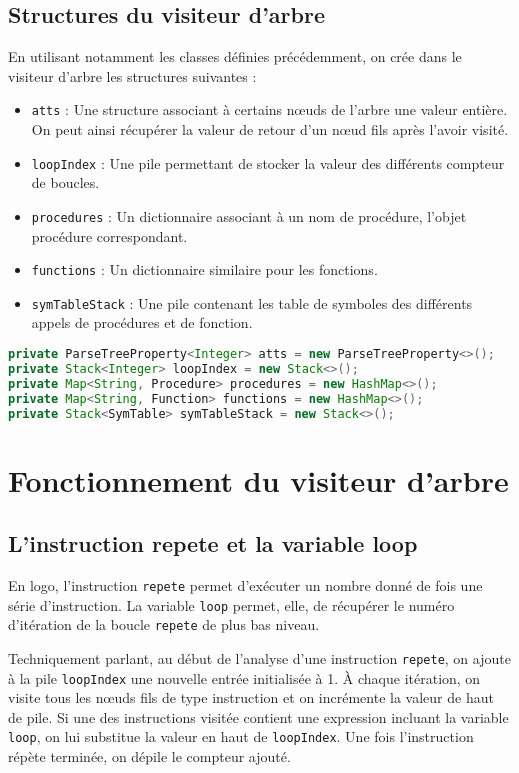 \documentclass[a4paper,11pt]{article}
\begin{document}
\subsection{Structures du visiteur d'arbre}
En utilisant notamment les classes définies précédemment, on crée dans le visiteur d'arbre les structures suivantes :
\begin{itemize}
	\item \lstinline$atts$ : Une structure associant à certains nœuds de l'arbre une valeur entière. On peut ainsi récupérer la valeur de retour d'un nœud fils après l'avoir visité.
	\item \lstinline$loopIndex$ : Une pile permettant de stocker la valeur des différents compteur de boucles.
	\item \lstinline$procedures$ : Un dictionnaire associant à un nom de procédure, l'objet procédure correspondant.
	\item \lstinline$functions$ : Un dictionnaire similaire pour les fonctions.
	\item \lstinline$symTableStack$ : Une pile contenant les table de symboles des différents appels de procédures et de fonction.
\end{itemize}
\begin{lstlisting}[language=Java]
private ParseTreeProperty<Integer> atts = new ParseTreeProperty<>();
private Stack<Integer> loopIndex = new Stack<>();
private Map<String, Procedure> procedures = new HashMap<>();
private Map<String, Function> functions = new HashMap<>();
private Stack<SymTable> symTableStack = new Stack<>();
\end{lstlisting}

\section{Fonctionnement du visiteur d'arbre}
\subsection{L'instruction repete et la variable loop}
En logo, l'instruction \lstinline$repete$ permet d’exécuter un nombre donné de fois une série d'instruction.
La variable \lstinline$loop$ permet, elle, de récupérer le numéro d'itération de la boucle \lstinline$repete$ de plus bas niveau.

Techniquement parlant, au début de l'analyse d'une instruction \lstinline$repete$, on ajoute à la pile \lstinline$loopIndex$ une nouvelle entrée initialisée à 1.
À chaque itération, on visite tous les nœuds fils de type instruction et on incrémente la valeur de haut de pile.
Si une des instructions visitée contient une expression incluant la variable \lstinline$loop$, on lui substitue la valeur en haut de \lstinline$loopIndex$.
Une fois l'instruction répète terminée, on dépile le compteur ajouté.
\end{document}
